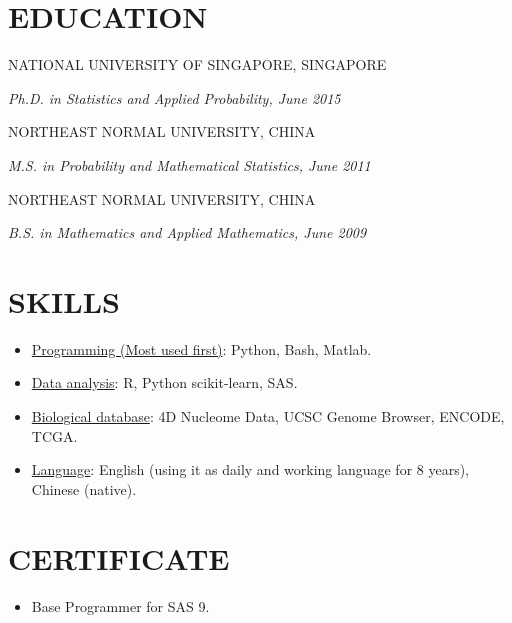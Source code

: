 \documentclass[paper=letter,fontsize=11pt]{scrartcl} %
\newlength{\spacebox}
\newcommand{\sepspace}{\vspace*{1em}}		%
\newcommand{\NewPart}[2]{\section*{\uppercase{#1} #2}}
\newcommand{\PersonalEntry}[2]{
		\noindent\hangindent=2em\hangafter=0 %
		\parbox{\spacebox}{        %
		\textit{#1}}		       %
		\hspace{1.5em} #2 \par}    %
\newcommand{\SkillsEntry}[2]{      %
    \noindent \underline{#1}: #2 \par }
\newcommand{\EducationEntry}[4]{
		\noindent \uppercase{#3}  \par  %
		\noindent \textit{#1, #2}         %
        \par }
\begin{document}
\NewPart{Education}{}
\EducationEntry{Ph.D. in Statistics and Applied Probability}{June 2015}{National University of Singapore, Singapore}{Thesis title: Biological Network Analysis and Comparison\\
Thesis advisor: Dr. Kwok Pui Choi}
\sepspace
\EducationEntry{M.S. in Probability and Mathematical Statistics}{June  2011}{Northeast Normal University, China}{Thesis title: Random Network Models' Discrimination \\
Thesis advisor: Dr. Zhidong Bai}
\sepspace
\EducationEntry{B.S. in Mathematics and Applied Mathematics}{June 2009}{Northeast Normal University, China}{}

\NewPart{Skills}{}
\begin{itemize}
    \item \SkillsEntry{Programming (Most used first)}{Python, Bash, Matlab.}
    \item \SkillsEntry{Data analysis}{R, Python scikit-learn, SAS.}
    \item \SkillsEntry{Biological database}{4D Nucleome Data, UCSC Genome Browser, ENCODE, TCGA.}
    \item \SkillsEntry{Language}{English (using it as daily and working language for 8 years), Chinese (native).}
\end{itemize}

\NewPart{Certificate}{}
\begin{itemize}
\item Base Programmer for SAS 9.
\end{itemize}
\end{document}
